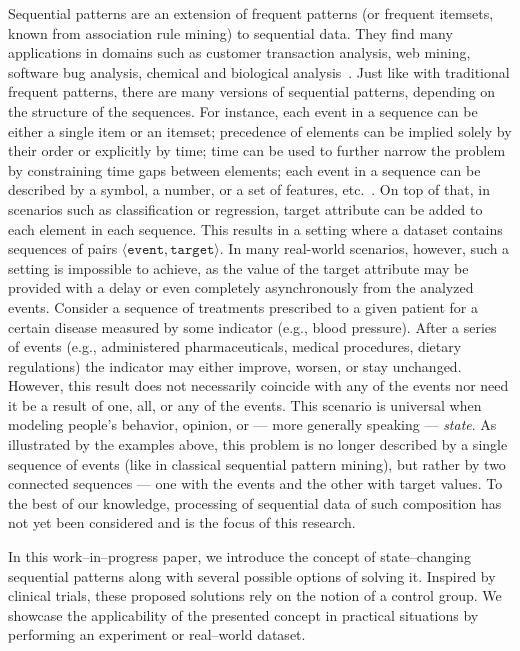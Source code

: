 \documentclass[runningheads,a4paper]{llncs}
\begin{document}
Sequential patterns are an extension of frequent patterns (or frequent itemsets, known from association rule mining) to sequential data.
They find many applications in domains such as customer transaction analysis, web mining, software bug analysis, chemical and biological analysis~\cite{Aggarwal:2014}.
Just like with traditional frequent patterns, there are many versions of sequential patterns, depending on the structure of the sequences.
For instance, each event in a sequence can be either a single item or an itemset; precedence of elements can be implied solely by their order or explicitly by time; time can be used to further narrow the problem by constraining time gaps between elements; each event in a sequence can be described by a symbol, a number, or a set of features, etc.~\cite{Dong:2009}.
On top of that, in scenarios such as classification or regression, target attribute can be added to each element in each sequence.
This results in a setting where a dataset contains sequences of pairs $\langle\texttt{event}, \texttt{target}\rangle$.
In many real-world scenarios, however, such a setting is impossible to achieve, as the value of the target attribute may be provided with a delay or even completely asynchronously from the analyzed events.
Consider a sequence of treatments prescribed to a given patient for a certain disease measured by some indicator (e.g., blood pressure).
After a series of events (e.g., administered pharmaceuticals, medical procedures, dietary regulations) the indicator may either improve, worsen, or stay unchanged.
However, this result does not necessarily coincide with any of the events nor need it be a result of one, all, or any of the events.
This scenario is universal when modeling people's behavior, opinion, or --- more generally speaking --- \textit{state}.
As illustrated by the examples above, this problem is no longer described by a single sequence of events (like in classical sequential pattern mining), but rather by two connected sequences --- one with the events and the other with target values.
To the best of our knowledge, processing of sequential data of such composition has not yet been considered and is the focus of this research.

In this work--in--progress paper, we introduce the concept of state--changing sequential patterns along with several possible options of solving it.
Inspired by clinical trials, these proposed solutions rely on the notion of a control group.
We showcase the applicability of the presented concept in practical situations by performing an experiment or real--world dataset.
\end{document}
